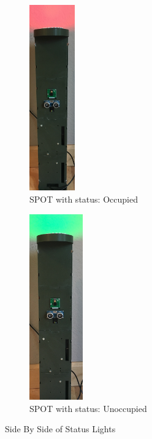 \begin{figure}
\centering
\begin{subfigure}{.4\textwidth}
  \centering
  \includegraphics[width=.27\linewidth, height=8cm]{pictures/IMG_1664.JPG}
  \caption{SPOT with status: Occupied}
  \label{fig:3dprinted}
\end{subfigure}%
\hfill
\begin{subfigure}{.5\textwidth}
  \centering
  \includegraphics[width=.27\linewidth, height=8cm]{pictures/IMG_1668.JPG}
  \caption{SPOT with status: Unoccupied}
  \label{fig:acrylictube}
\end{subfigure}
\caption{Side By Side of Status Lights}
\label{fig:occupy}
\end{figure}

